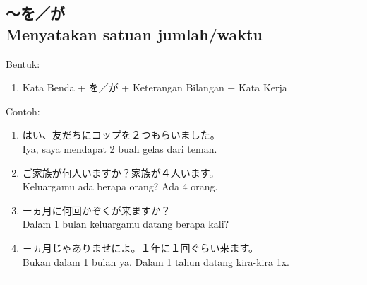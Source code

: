\subsection*{
    ～を／が \\
    Menyatakan satuan jumlah/waktu
}
Bentuk:
\begin{enumerate}
    \item Kata Benda + を／が + Keterangan Bilangan + Kata Kerja
\end{enumerate}
Contoh: 
\begin{enumerate}
    \item はい、友だちにコップを２つもらいました。
    \\ Iya, saya mendapat 2 buah gelas dari teman.
    \item ご家族が何人いますか？家族が４人います。
    \\ Keluargamu ada berapa orang? Ada 4 orang.
    \item ーヵ月に何回かぞくが来ますか？
    \\ Dalam 1 bulan keluargamu datang berapa kali?
    \item －ヵ月じゃありませによ。１年に１回ぐらい来ます。
    \\ Bukan dalam 1 bulan ya. Dalam 1 tahun datang kira-kira 1x.
\end{enumerate}

\vspace{0.2cm}\hrule height 1pt\vspace{0.2cm}
